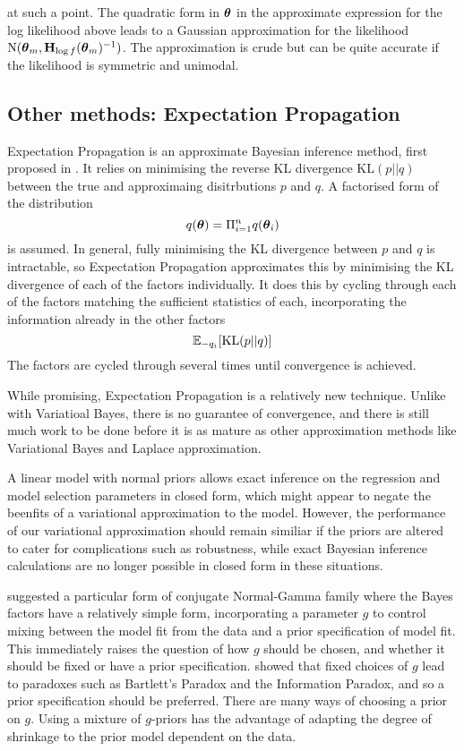 \noindent at such a point. The quadratic form in ${\boldsymbol \theta}$ in the approximate expression for the log
likelihood above leads to a Gaussian approximation for the likelihood $\text{N}({\boldsymbol \theta}_m, {\bf H}_{\log
f}({\boldsymbol \theta}_m)^{-1})$. The approximation is crude but can be quite accurate if the likelihood is symmetric and
unimodal.

\subsection{Other methods: Expectation Propagation}
Expectation Propagation is an approximate Bayesian inference method, first proposed in \citep{Minka2001}.
It relies on minimising the reverse KL divergence $\text{KL}(p || q)$ between the true and approximaing
disitrbutions $p$ and $q$. A factorised form of the distribution
\[
	q({\boldsymbol \theta}) = \Pi_{i=1}^n q({\boldsymbol \theta}_i)
\]
is assumed. In general, fully minimising the KL divergence between $p$ and $q$ is intractable, so Expectation
Propagation approximates this by minimising the KL divergence of each of the factors individually.
It does this by cycling through each of the factors matching the sufficient statistics of each, incorporating
the information already in the other factors
\[
	{\mathbb E}_{-q_i} [\text{KL}(p || q)]
\]
The factors are cycled through several times until convergence is achieved.

While promising, Expectation Propagation is a relatively new technique.
Unlike with Variatioal Bayes, there is no guarantee of convergence, and there is still much work to be done
before it is as mature as other approximation methods like Variational Bayes and Laplace approximation.

A linear model with normal priors allows exact inference on the regression and model selection parameters in
closed form, which might appear to negate the beenfits of a variational approximation to the model. However,
the performance of our variational approximation should remain similiar if the priors are altered to cater for
complications such as robustness, while exact Bayesian inference calculations are no longer possible in closed
form in these situations.

\cite{Zellner1986} suggested a particular form of conjugate Normal-Gamma family where the Bayes factors have a
relatively simple form, incorporating a parameter $g$ to control mixing between the model fit from the data
and a prior specification of model fit. This immediately raises the question of how $g$ should be chosen, and
whether it should be fixed or have a prior specification. \cite{Liang2008} showed that fixed choices of $g$
lead to paradoxes such as Bartlett's Paradox and the Information Paradox, and so a prior specification should
be preferred. There are many ways of choosing a prior on $g$. Using a mixture of $g$-priors has the advantage
of adapting the degree of shrinkage to the prior model dependent on the data.

